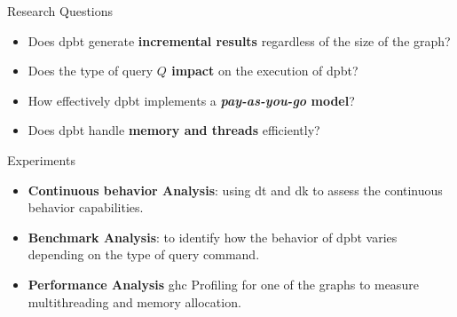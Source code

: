 \begin{frame}[fragile]{Research Questions}
    \begin{itemize}
      \setlength\itemsep{2em}
        \item Does \acrshort{dpbt} generate \textbf{incremental results} regardless of the size of the graph?
        \item Does the type of query \textbf{$Q$ impact} on the execution of \acrshort{dpbt}?
        \item How effectively \acrshort{dpbt} implements a \textbf{\emph{pay-as-you-go} model}?
        \item Does \acrshort{dpbt} handle \textbf{memory and threads} efficiently?
    \end{itemize}        
\end{frame}

\begin{frame}[fragile]{Experiments}
    \begin{itemize}
      \setlength\itemsep{2em}
      \item \textbf{Continuous behavior Analysis}: using \acrshort{dt} and \acrshort{dk} to assess the continuous behavior capabilities.
      \item \textbf{Benchmark Analysis}: to identify how the behavior of \acrshort{dpbt} varies depending on the type of query command.
      \item \textbf{Performance Analysis} \acrfull{ghc} Profiling for one of the graphs to measure multithreading and memory allocation. 
    \end{itemize}
\end{frame}

